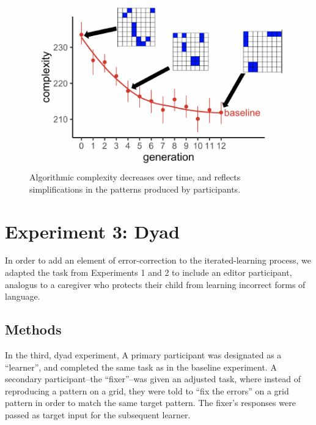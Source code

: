 \documentclass[10pt, letterpaper]{article}
\newenvironment{CodeChunk}{}{}
\begin{document}
\begin{CodeChunk}
\begin{figure}[tb]

{\centering \includegraphics{figs/baseline_withplots-1} 

}

\caption[Algorithmic complexity decreases over time, and reflects simplifications in the patterns produced by participants]{Algorithmic complexity decreases over time, and reflects simplifications in the patterns produced by participants.}\label{fig:baseline_withplots}
\end{figure}
\end{CodeChunk}

\hypertarget{experiment-3-dyad}{%
\section{Experiment 3: Dyad}\label{experiment-3-dyad}}

In order to add an element of error-correction to the iterated-learning
process, we adapted the task from Experiments 1 and 2 to include an
editor participant, analogus to a caregiver who protects their child
from learning incorrect forms of language.

\hypertarget{methods-1}{%
\subsection{Methods}\label{methods-1}}

In the third, dyad experiment, A primary participant was designated as a
``learner'', and completed the same task as in the baseline experiment.
A secondary participant--the ``fixer''--was given an adjusted task,
where instead of reproducing a pattern on a grid, they were told to
``fix the errors'' on a grid pattern in order to match the same target
pattern. The fixer's responses were passed as target input for the
subsequent learner.
\end{document}
